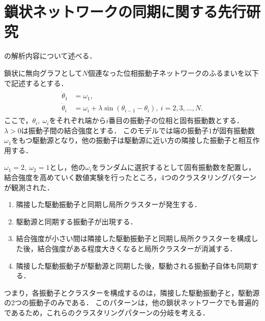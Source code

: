\documentclass[../main]{subfiles}
\begin{document}
\chapter{鎖状ネットワークの同期に関する先行研究}
\label{chap:appendix}
\cite{XiaHuang:130506}の解析内容について述べる．

鎖状に無向グラフとして$N$個連なった位相振動子ネットワークのふるまいを以下で記述するとする．
\begin{align}
    \begin{split}
        \dot{\theta}_1&=\omega_1,\\
        \dot{\theta}_i&=\omega_i+\lambda\sin(\theta_{i-1}-\theta_i),\ i=2,3,\ldots,N.
    \end{split}
\end{align}
ここで，$\theta_i,\ \omega_i$をそれぞれ端から$i$番目の振動子の位相と固有振動数とする．$\lambda>0$は振動子間の結合強度とする．
このモデルでは端の振動子$1$が固有振動数$\omega_1$をもつ駆動源となり，他の振動子は駆動源に近い方の隣接した振動子と相互作用する．

$\omega_1=2,\ \omega_2=1$とし，他の$\omega_i$をランダムに選択するとして固有振動数を配置し，結合強度を高めていく数値実験を行ったところ，4つのクラスタリングパターンが観測された．
\renewcommand{\labelenumi}{Case  \theenumi}
\begin{enumerate}
    \item \label{enu:case1} 隣接した駆動振動子と同期し局所クラスターが発生する．
    \item \label{enu:case2} 駆動源と同期する振動子が出現する．
    \item \label{enu:case3} 結合強度が小さい間は隣接した駆動振動子と同期し局所クラスターを構成した後，結合強度がある程度大きくなると局所クラスターが消滅する．
    \item \label{enu:case4} 隣接した駆動振動子が駆動源と同期した後，駆動される振動子自体も同期する．
\end{enumerate}
つまり，各振動子とクラスターを構成するのは，隣接した駆動振動子と，駆動源の2つの振動子のみである．
このパターンは，他の鎖状ネットワークでも普遍的であるため，これらのクラスタリングパターンの分岐を考える．
\end{document}
